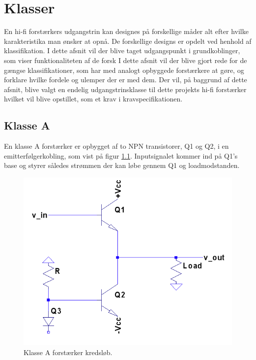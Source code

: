 \chapter{Klasser}
En hi-fi forstærkers udgangstrin kan designes på forskellige måder alt efter hvilke karakteristika man ønsker at opnå. De forskellige designs er opdelt ved henhold af klassifikation. I dette afsnit vil der blive taget udgangspunkt i grundkoblinger, som viser funktionaliteten af de forsk 
I dette afsnit vil der blive gjort rede for de gængse klassifikationer, som har med analogt opbyggede forstærkere at gøre, og forklare hvilke fordele og ulemper der er med dem. Der vil, på baggrund af dette afsnit, blive valgt en endelig udgangstrinsklasse til dette projekts hi-fi forstærker hvilket vil blive opstillet, som et krav i kravspecifikationen.

\section{Klasse A}

En klasse A forstærker er opbygget af to NPN transistorer, Q1 og Q2, i en emitterfølgerkobling, som vist på figur \ref{fig:classa}. Inputsignalet kommer ind på Q1's base og styrer således strømmen der kan løbe gennem Q1 og loadmodstanden. 

\begin{figure}[h]
\centering
\includegraphics[scale=.6]{klasser/classa.png}
\caption{Klasse A forstærker kredsløb.}
\label{fig:classa}
\end{figure}


